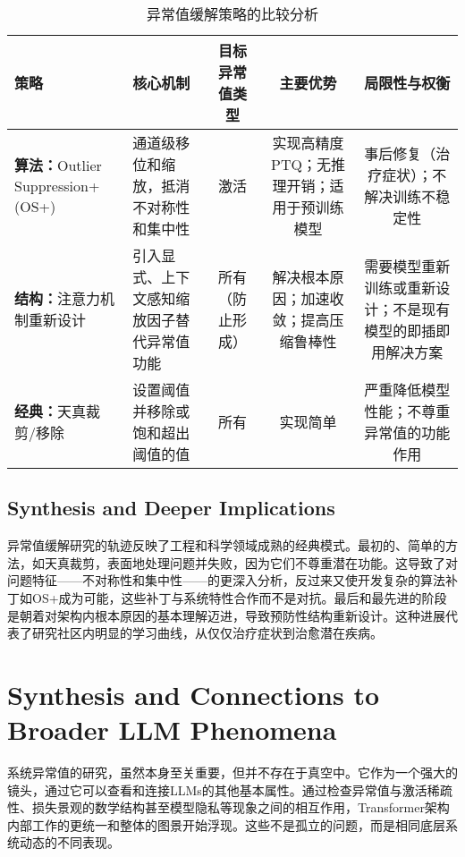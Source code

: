 \documentclass{article}
\begin{document}
\begin{table}
  \caption{异常值缓解策略的比较分析}
  \label{mitigation-strategies}
  \centering
  \begin{tabular}{llccc}
    \toprule
    策略 & 核心机制 & 目标异常值类型 & 主要优势 & 局限性与权衡 \\
    \midrule
    \textbf{算法：}\newline Outlier Suppression+ (OS+) & 通道级移位和缩放，抵消不对称性和集中性 & 激活 & 实现高精度PTQ；无推理开销；适用于预训练模型 & 事后修复（治疗症状）；不解决训练不稳定性 \\
    \textbf{结构：}\newline 注意力机制重新设计 & 引入显式、上下文感知缩放因子替代异常值功能 & 所有（防止形成） & 解决根本原因；加速收敛；提高压缩鲁棒性 & 需要模型重新训练或重新设计；不是现有模型的即插即用解决方案 \\
    \textbf{经典：}\newline 天真裁剪/移除 & 设置阈值并移除或饱和超出阈值的值 & 所有 & 实现简单 & 严重降低模型性能；不尊重异常值的功能作用 \\
    \bottomrule
  \end{tabular}
\end{table}

\subsection{Synthesis and Deeper Implications}

异常值缓解研究的轨迹反映了工程和科学领域成熟的经典模式。最初的、简单的方法，如天真裁剪，表面地处理问题并失败，因为它们不尊重潜在功能。这导致了对问题特征——不对称性和集中性——的更深入分析，反过来又使开发复杂的算法补丁如OS+成为可能，这些补丁与系统特性合作而不是对抗。最后和最先进的阶段是朝着对架构内根本原因的基本理解迈进，导致预防性结构重新设计。这种进展代表了研究社区内明显的学习曲线，从仅仅治疗症状到治愈潜在疾病。

\section{Synthesis and Connections to Broader LLM Phenomena}

系统异常值的研究，虽然本身至关重要，但并不存在于真空中。它作为一个强大的镜头，通过它可以查看和连接LLMs的其他基本属性。通过检查异常值与激活稀疏性、损失景观的数学结构甚至模型隐私等现象之间的相互作用，Transformer架构内部工作的更统一和整体的图景开始浮现。这些不是孤立的问题，而是相同底层系统动态的不同表现。
\end{document}
